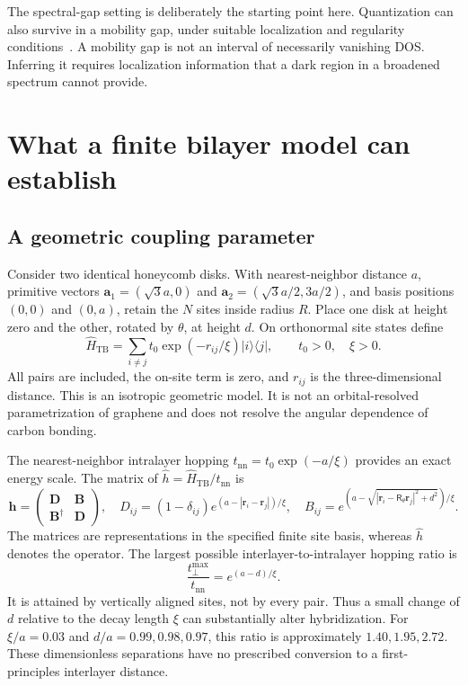 \documentclass[11pt,a4paper]{article}
\begin{document}
The spectral-gap setting is deliberately the starting point here. Quantization can also survive in a mobility gap, under suitable localization and regularity conditions~\cite{bellissard1994,bourne2018}. A mobility gap is not an interval of necessarily vanishing DOS. Inferring it requires localization information that a dark region in a broadened spectrum cannot provide.

\section{What a finite bilayer model can establish}
\label{sec:model}

\subsection{A geometric coupling parameter}

Consider two identical honeycomb disks. With nearest-neighbor distance $a$, primitive vectors $\bm a_1=(\sqrt{3}a,0)$ and $\bm a_2=(\sqrt{3}a/2,3a/2)$, and basis positions $(0,0)$ and $(0,a)$, retain the $N$ sites inside radius $R$. Place one disk at height zero and the other, rotated by $\theta$, at height $d$. On orthonormal site states define
\begin{equation}
 \hat H_{\mathrm{TB}}=\sum_{i\ne j}t_0\exp(-r_{ij}/\xi)|i\rangle\langle j|,
 \qquad t_0>0,\quad \xi>0.
 \label{eq:bilayer}
\end{equation}
All pairs are included, the on-site term is zero, and $r_{ij}$ is the three-dimensional distance. This is an isotropic geometric model. It is not an orbital-resolved parametrization of graphene and does not resolve the angular dependence of carbon bonding.

The nearest-neighbor intralayer hopping $t_{\mathrm{nn}}=t_0\exp(-a/\xi)$ provides an exact energy scale. The matrix of $\hat h=\hat H_{\mathrm{TB}}/t_{\mathrm{nn}}$ is
\begin{equation}
 \bm h=\begin{pmatrix}\bm D&\bm B\\\bm B^\dagger&\bm D\end{pmatrix},
 \quad D_{ij}=(1-\delta_{ij})e^{(a-|\bm r_i-\bm r_j|)/\xi},
 \quad B_{ij}=e^{(a-\sqrt{|\bm r_i-\mathsf R_\theta\bm r_j|^2+d^2})/\xi}.
 \label{eq:block}
\end{equation}
The matrices are representations in the specified finite site basis, whereas $\hat h$ denotes the operator. The largest possible interlayer-to-intralayer hopping ratio is
\begin{equation}
 \frac{t_\perp^{\max}}{t_{\mathrm{nn}}}=e^{(a-d)/\xi}.
 \label{eq:coupling}
\end{equation}
It is attained by vertically aligned sites, not by every pair. Thus a small change of $d$ relative to the decay length $\xi$ can substantially alter hybridization. For $\xi/a=0.03$ and $d/a=0.99,0.98,0.97$, this ratio is approximately $1.40,1.95,2.72$. These dimensionless separations have no prescribed conversion to a first-principles interlayer distance.
\end{document}
